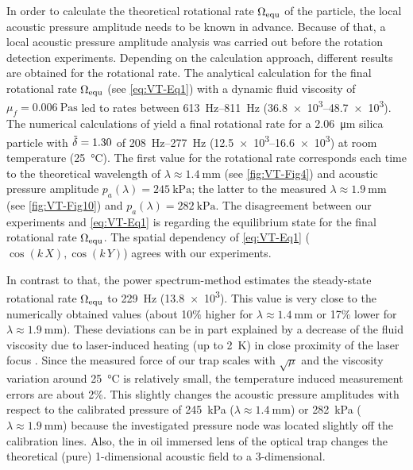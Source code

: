 In order to calculate the theoretical rotational rate $\Omega_{\mathrm{equ}}$ of the 
particle, the local acoustic pressure amplitude needs to be known in advance.  
Because of that, a local acoustic pressure amplitude analysis was carried out 
before the rotation detection experiments. Depending on the calculation 
approach, different results are obtained for the rotational rate. The analytical 
calculation for the final rotational rate $\Omega_{\mathrm{equ}}$ (see \cref{eq:VT-Eq1}) 
\cite{Lamprecht2015, Busse1981, Rudnick1977, Wang1989} with a dynamic fluid 
viscosity of $\mu_{f} = \SI{0.006}{\pascal\second}$ led to rates between 
\SIrange{613}{811}{\hertz} (\SIrange{36.8e3}{48.7e3}{\rpm}). The numerical 
calculations of \citeauthor{Hahn2016} \cite{Hahn2016} yield a final rotational 
rate for a \SI{2.06}{\micro\meter} silica particle with $\tilde{\delta}=1.30$ of 
\SIrange{208}{277}{\hertz} (\SIrange{12.5e3}{16.6e3}{\rpm}) at room temperature 
(\SI{25}{\celsius}).  The first value for the rotational rate corresponds each 
time to the theoretical wavelength of $\lambda \approx \SI{1.4}{\mm}$ (see 
\cref{fig:VT-Fig4}) and acoustic pressure amplitude $p_{a}\left(\lambda\right) 
= \SI{245}{\kilo\pascal} $; the latter to the measured $\lambda \approx 
\SI{1.9}{\mm}$ (see \cref{fig:VT-Fig10}) and $p_{a}\left(\lambda\right) = 
\SI{282}{\kilo\pascal} $. The disagreement between our experiments and 
\cref{eq:VT-Eq1} is regarding the equilibrium state for the final rotational 
rate $\Omega_{\mathrm{equ}}$. The spatial dependency of \cref{eq:VT-Eq1} 
($\cos\left(k\,X\right), \cos\left( k\,Y \right)$) agrees with our experiments.

In contrast to that, the power spectrum-method estimates the steady-state 
rotational rate $\Omega_{\mathrm{equ}}$ to \SI{229}{\hertz} (\SI{13.8e3}{\rpm}). This 
value is very close to the numerically obtained values (about 10$\%$ higher for 
$\lambda \approx \SI{1.4}{\mm}$ or 17$\%$ lower for $\lambda \approx 
\SI{1.9}{\mm}$).  These deviations can be in part explained by a decrease of 
the fluid viscosity due to laser-induced heating (up to \SI{2}{\kelvin}) in 
close proximity of the laser focus \cite{Peterman2003}. Since the measured force 
of our trap scales with $\sqrt{\mu}$ and the viscosity variation around 
\SI{25}{\celsius} is relatively small, the temperature induced measurement 
errors are about 2\%.  This slightly changes the acoustic pressure amplitudes 
with respect to the calibrated pressure of \SI{245}{\kilo\pascal} ($\lambda 
\approx \SI{1.4}{\mm}$) or \SI{282}{\kilo\pascal} ($\lambda \approx 
\SI{1.9}{\mm}$) because the investigated pressure node was located slightly off 
the calibration lines.  Also, the in oil immersed lens of the optical trap 
changes the theoretical (pure) 1-dimensional acoustic field to a 3-dimensional.

